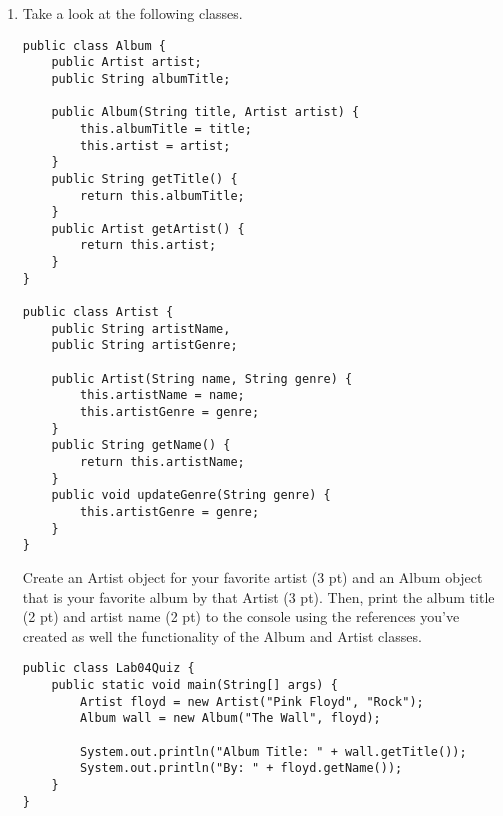 \Instructions
\begin{enumerate}

\item {} Take a look at the following classes.  

\begin{lstlisting}
public class Album {
	public Artist artist;
	public String albumTitle;

	public Album(String title, Artist artist) {
		this.albumTitle = title;
		this.artist = artist;
	}
	public String getTitle() {
		return this.albumTitle;
	}
	public Artist getArtist() {
		return this.artist;
	}
}

public class Artist {
	public String artistName, 
    public String artistGenre;

	public Artist(String name, String genre) {
		this.artistName = name;
		this.artistGenre = genre;
	}
	public String getName() {
		return this.artistName;
	}
	public void updateGenre(String genre) {
		this.artistGenre = genre;
	}
}
\end{lstlisting}
Create an Artist object for your favorite artist (3 pt) and an Album object that is your favorite album by that Artist (3 pt).  Then, print the album title (2 pt) and artist name (2 pt) to the console using the references you've created as well the functionality of the Album and Artist classes. 
\begin{lstlisting}
public class Lab04Quiz {
    public static void main(String[] args) {
        Artist floyd = new Artist("Pink Floyd", "Rock");
        Album wall = new Album("The Wall", floyd);

        System.out.println("Album Title: " + wall.getTitle());
        System.out.println("By: " + floyd.getName());
	}
}
\end{lstlisting}
\end{enumerate}